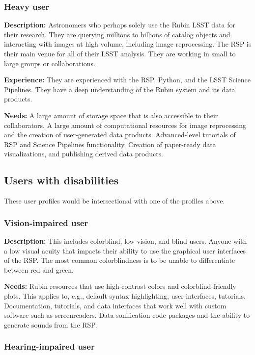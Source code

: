 \subsubsection{Heavy user}

\textbf{Description:} 
Astronomers who perhaps solely use the Rubin LSST data for their research.
They are querying millions to billions of catalog objects and interacting
with images at high volume, including image reprocessing.
The RSP is their main venue for all of their LSST analysis.
They are working in small to large groups or collaborations.

\textbf{Experience:} 
They are experienced with the RSP, Python, and the LSST Science Pipelines.
They have a deep understanding of the Rubin system and its data products.

\textbf{Needs:}
A large amount of storage space that is also accessible to their collaborators.
A large amount of computational resources for image reprocessing and the
creation of user-generated data products.
Advanced-level tutorials of RSP and Science Pipelines functionality.
Creation of paper-ready data visualizations, and publishing derived data products.

\subsection{Users with disabilities}

These user profiles would be intersectional with one of the profiles above.

\subsubsection{Vision-impaired user}

\textbf{Description:}
This includes colorblind, low-vision, and blind users.
Anyone with a low visual acuity that impacts their ability to use the 
graphical user interfaces of the RSP.
The most common colorblindness is to be unable to differentiate between red and green.

\textbf{Needs:}
Rubin resources that use high-contrast colors and colorblind-friendly plots.
This applies to, e.g., default syntax highlighting, user interfaces, tutorials.
Documentation, tutorials, and data interfaces that work well with custom software such
as screenreaders.
Data sonification code packages and the ability to generate sounds from the RSP.

\subsubsection{Hearing-impaired user}

